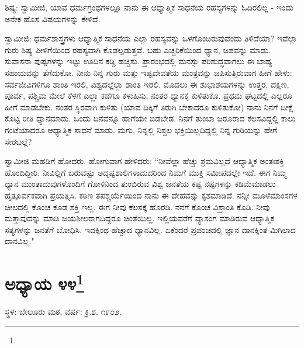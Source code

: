 ಶಿಷ್ಯ: ಸ್ವಾಮೀಜಿ, ಯಾವ ಧರ್ಮಗ್ರಂಥಗಳಲ್ಲೂ ನಾನು ಈ ಆಧ್ಯಾತ್ಮಿಕ ಸಾಧನೆಯ ರಹಸ್ಯಗಳನ್ನು ಓದಿರಲಿಲ್ಲ - ಇಂದು ಅನೇಕ ಹೊಸ ವಿಷಯಗಳನ್ನು ಕೇಳಿದೆ.

ಸ್ವಾಮೀಜಿ: ಧರ್ಮಶಾಸ್ತ್ರಗಳು ಆಧ್ಯಾತ್ಮಿಕ ಸಾಧನೆಯ ಎಲ್ಲಾ ರಹಸ್ಯವನ್ನು ಒಳಗೊಂಡಿರುವುವೆಂದು ತಿಳಿದೆಯಾ? ಇವೆಲ್ಲಾ ಗುರು ಶಿಷ್ಯ ಪೀಳಿಗೆಯಿಂದ ರಹಸ್ಯವಾಗಿ ಕೊಡಲ್ಪಡುತ್ತವೆ. ಬಹು ಎಚ್ಚರಿಕೆಯಿಂದ ಧ್ಯಾನ, ಜಪವನ್ನು ಮಾಡು. ಸುವಾಸನಾ ಪುಷ್ಪಗಳನ್ನು ಇಟ್ಟು ಊದಿನ ಕಡ್ಡಿ ಹಚ್ಚಿಸು. ಪ್ರಾರಂಭದಲ್ಲಿ ಮನಸ್ಸು ಪರಿಶುದ್ಧವಾಗಲು ಈ ಬಾಹ್ಯ ಸಹಾಯವನ್ನು ತೆಗೆದುಕೋ. ನೀನು ನಿನ್ನ ಗುರು ಮತ್ತು ಇಷ್ಟದೇವತೆಯ ಮಂತ್ರವನ್ನು ಜಪಿಸುತ್ತಿರುವಾಗ ಹೀಗೆ ಹೇಳು: ಸರ್ವಜೀವಿಗಳಿಗೂ ಶಾಂತಿ ಇರಲಿ, ವಿಶ್ವದಲ್ಲೆಲ್ಲಾ ಶಾಂತಿ ಇರಲಿ. ಮೊದಲು ಈ ಶುಭಾಶಯಗಳನ್ನು ಉತ್ತರ, ದಕ್ಷಿಣ, ಪೂರ್ವ, ಪಶ್ಚಿಮ ಮೇಲೆ ಕೆಳಗೆ ಎಲ್ಲಾ ಕಡೆಗೂ ಕಳುಹಿಸು, ನಂತರ ಧ್ಯಾನಕ್ಕೆ ಕುಳಿತುಕೊ. ಪ್ರಥಮ ಘಟ್ಟದಲ್ಲಿ ಎಲ್ಲರೂ ಹೀಗೆ ಮಾಡಬೇಕು. ನಂತರ ಸ್ಥಿರವಾಗಿ ಕುಳಿತು (ಯಾವ ದಿಕ್ಕಿಗೆ ತಿರುಗಿ ಬೇಕಾದರೂ ಕುಳಿತುಕೋ) ನಾನು ನಿನಗೆ ದೀಕ್ಷೆ ಕೊಟ್ಟ ರೀತಿ ಧ್ಯಾನಮಾಡು. ಒಂದು ದಿನವನ್ನೂ ಹಾಗೆಯೇ ಬಿಡಬೇಡ. ನಿನಗೆ ತುಂಬಾ ಜರೂರಾದ ಕೆಲಸವಿದ್ದಲ್ಲಿ ಕಾಲು ಗಂಟೆಯಾದರೂ ಆಧ್ಯಾತ್ಮಿಕ ಸಾಧನೆ ಮಾಡು. ಮಗು, ನಿನ್ನಲ್ಲಿ ನಿಶ್ಚಲ ಭಕ್ತಿಯಿಲ್ಲದಿದ್ದಲ್ಲಿ ನಿನ್ನ ಗುರಿಯನ್ನು ಹೇಗೆ ಸೇರಬಲ್ಲೆ?

ಸ್ವಾಮೀಜಿ ಮಹಡಿಗೆ ಹೋದರು. ಹೋಗುವಾಗ ಹೇಳಿದರು: “ನೀವೆಲ್ಲಾ ಹೆಚ್ಚು ಶ್ರಮವಿಲ್ಲದೆ ಆಧ್ಯಾತ್ಮಿಕ ಅಂತಃಶಕ್ತಿ ಹೊಂದಿದ್ದೀರಿ. ನೀವಿಲ್ಲಿಗೆ ಬರುವಷ್ಟು ಅದೃಷ್ಟಶಾಲಿಗಳಾದುದರಿಂದ ನಿಮಗೆ ಮುಕ್ತಿ ಸಮೀಪದಲ್ಲೇ ಇದೆ. ಈಗ ನಿಮ್ಮ ಧ್ಯಾನ ಮುಂತಾದುವುಗಳೊಂದಿಗೆ ಗೋಳಿನಿಂದ ತುಂಬಿರುವ ವಿಶ್ವ ಜನತೆಯ ಕಷ್ಟ ನಷ್ಟಗಳನ್ನು ಕಡಿಮೆಮಾಡಲು ಹೃತ್ಪೂರ್ವಕವಾಗಿ ಪ್ರಯತ್ನಿಸಿ. ಕಠಿಣ ತಪಶ್ಚರ್ಯೆಯಿಂದ ನಾನು ಈ ದೇಹವನ್ನು ಕೃಶಮಾಡಿದೆ. ನನ್ನೀ ಮೂಳೆಮಾಂಸಗಳ ಚೀಲದಲ್ಲಿ ಕೊಂಚ ಕೂಡ ಶಕ್ತಿ ಇಲ್ಲ. ಈಗ ನೀವು ಕೆಲಸಕ್ಕೆ ಹೊರಡಿ. ನನಗೆ ಕೊಂಚ ವಿಶ್ರಾಂತಿ ಕೊಡಿ. ನೀವು ಮತ್ತಾವುದನ್ನು ಮಾಡಿ ಜಯಶೀಲರಾಗದಿದ್ದರೂ ಚಿಂತೆಯಿಲ್ಲ. ಇಲ್ಲಿಯವರೆಗೆ ವ್ಯಾಸಂಗ ಮಾಡಿರುವ ಆಧ್ಯಾತ್ಮಿಕ ಸತ್ಯಗಳನ್ನು ಜನತೆಗೆ ಬೋಧಿಸಿ. ಇದಕ್ಕಿಂಥ ಹೆಚ್ಚಾದ ಧ್ಯಾನವಿಲ್ಲ. ಏಕೆಂದರೆ ಪ್ರಪಂಚದಲ್ಲಿ ಜ್ಞಾನ ದಾನಕ್ಕಿಂತ ಮಿಗಿಲಾದ ದಾನವಿಲ್ಲ."

\newpage

\chapter[ಅಧ್ಯಾಯ ೪೪]{ಅಧ್ಯಾಯ ೪೪\protect\footnote{}}

\centerline{ಸ್ಥಳ: ಬೇಲೂರು ಮಠ, ವರ್ಷ: ಕ್ರಿ.ಶ. ೧೯೦೨.}

